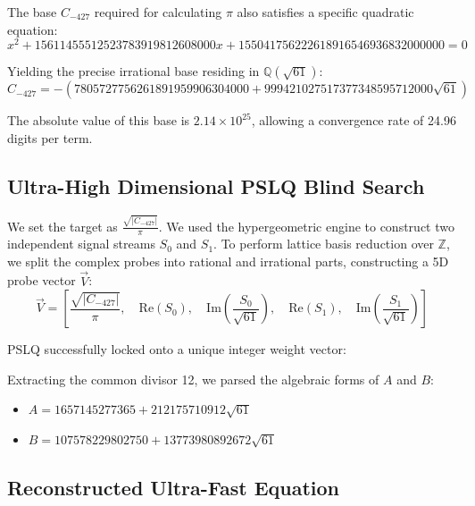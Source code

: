 \documentclass[11pt,a4paper]{article}
\begin{document}
The base $C_{-427}$ required for calculating $\pi$ also satisfies a specific quadratic equation:
\begin{equation}
x^2 + 15611455512523783919812608000x + 155041756222618916546936832000000 = 0
\end{equation}

Yielding the precise irrational base residing in $\mathbb{Q}(\sqrt{61})$:
\begin{equation}
C_{-427} = -(7805727756261891959906304000 + 999421027517377348595712000\sqrt{61})
\end{equation}

The absolute value of this base is $2.14 \times 10^{25}$, allowing a convergence rate of 24.96 digits per term.

\subsection{Ultra-High Dimensional PSLQ Blind Search}

We set the target as $\frac{\sqrt{|C_{-427}|}}{\pi}$. We used the hypergeometric engine to construct two independent signal streams $S_0$ and $S_1$. To perform lattice basis reduction over $\mathbb{Z}$, we split the complex probes into rational and irrational parts, constructing a 5D probe vector $\vec{V}$:
\begin{equation}
\vec{V} = \left[ \frac{\sqrt{|C_{-427}|}}{\pi}, \quad \text{Re}(S_0), \quad \text{Im}\left(\frac{S_0}{\sqrt{61}}\right), \quad \text{Re}(S_1), \quad \text{Im}\left(\frac{S_1}{\sqrt{61}}\right) \right]
\end{equation}

PSLQ successfully locked onto a unique integer weight vector:
\begin{equation}
[-1, \quad 19885743328380, \quad 2546108530944, \quad 1290938757633000, \quad 165287770712064]
\end{equation}

Extracting the common divisor 12, we parsed the algebraic forms of $A$ and $B$:
\begin{itemize}
    \item $A = 1657145277365 + 212175710912\sqrt{61}$
    \item $B = 107578229802750 + 13773980892672\sqrt{61}$
\end{itemize}

\subsection{Reconstructed Ultra-Fast Equation}
\end{document}
